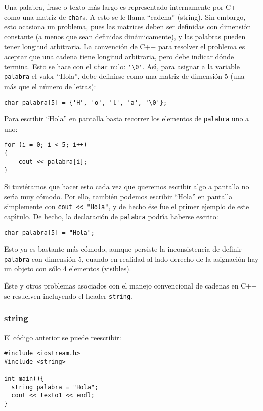 Una palabra, frase o texto m\'as largo es representado internamente
por C++ como una matriz de \verb+char+s. A esto se le llama ``cadena''
(string). Sin embargo, esto ocasiona un
problema, pues las matrices deben ser definidas con dimensi\'on
constante (a menos que sean definidas din\'amicamente), y las palabras
pueden tener longitud arbitraria. La convenci\'on de C++ para resolver
el problema es aceptar que una cadena tiene longitud arbitraria, pero
debe indicar d\'onde termina. Esto se hace con el \verb+char+ nulo: 
\verb+'\0'+. As\'{\i}, para asignar a la variable \verb+palabra+ 
el valor ``Hola'', debe definirse como una matriz de dimensi\'on 5
(una m\'as que el n\'umero de letras):
\begin{verbatim}
char palabra[5] = {'H', 'o', 'l', 'a', '\0'};
\end{verbatim}
Para escribir ``Hola'' en pantalla basta recorrer los elementos de
\verb+palabra+ uno a uno:
\begin{verbatim}
for (i = 0; i < 5; i++)
{
    cout << palabra[i];
}
\end{verbatim}
Si tuvi\'eramos que hacer esto cada vez que queremos escribir algo a
pantalla no ser\'{\i}a muy c\'omodo. Por ello, tambi\'en podemos
escribir ``Hola'' en pantalla simplemente con \verb+cout << "Hola"+, y
de hecho \'ese fue el primer ejemplo de este cap\'{\i}tulo. De hecho,
la declaraci{\'o}n de
\verb+palabra+ podr\'{\i}a haberse escrito:
\begin{verbatim}
char palabra[5] = "Hola";
\end{verbatim}
Esto ya es bastante m\'as c\'omodo, aunque persiste la inconsistencia
de definir \verb+palabra+ con dimensi\'on 5, cuando en realidad al
lado derecho de la asignaci\'on hay un objeto con s\'olo 4 elementos
(visibles). 

\'Este y otros problemas asociados con el manejo convencional de
cadenas en C++ se resuelven  incluyendo  el header \verb+string+. 

\subsubsection{string}

El c\'odigo anterior se puede reescribir:
\begin{verbatim}
#include <iostream.h>
#include <string>

int main(){
  string palabra = "Hola";
  cout << texto1 << endl;
}
\end{verbatim}


